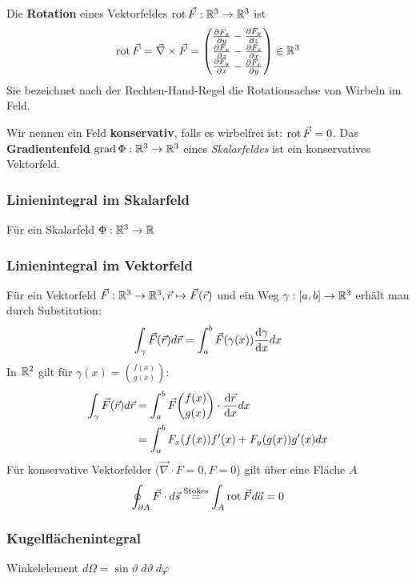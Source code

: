 Die \textbf{Rotation} eines Vektorfeldes $\operatorname{rot}\Vec{F}: \mathbb{R}^3 \to \mathbb{R}^3$ ist
$$\rot \Vec{F} = \Vec{\nabla} \times \Vec{F} =  \begin{pmatrix}\diffp{F_z}{y}-\diffp{F_y}{z}\\ \diffp{F_x}{z}-\diffp{F_z}{x} \\ \diffp{F_y}{x}-\diffp{F_x}{y}\end{pmatrix} \in \R^3$$
Sie bezeichnet nach der Rechten-Hand-Regel die Rotationsachse von Wirbeln im Feld.

Wir nennen ein Feld \textbf{konservativ}, falls es wirbelfrei ist: $\operatorname{rot}\Vec{F} = 0$. Das \textbf{Gradientenfeld} $\operatorname{grad} \Phi: \mathbb{R}^3 \to \mathbb{R}^3$ eines \textit{Skalarfeldes} ist ein konservatives Vektorfeld.

\subsubsection{Linienintegral im Skalarfeld}
Für ein Skalarfeld $\Phi: \mathbb{R}^3 \to \mathbb{R}$
\subsubsection{Linienintegral im Vektorfeld}
Für ein Vektorfeld $\Vec{F}:\mathbb{R}^3 \to \mathbb{R}^3, \Vec{r} \mapsto \Vec{F}(\Vec{r})$ und ein Weg $\gamma: [a,b] \to \mathbb{R}^3$ erhält man durch Substitution:
$$\int_\gamma \Vec{F}(\Vec{r}) d\Vec{r} = \int_a^b \Vec{F}(\gamma(x)) \diff{\gamma}{x} dx$$
In $\mathbb{R}^2$ gilt für $\gamma(x) = \binom{f(x)}{g(x)}$:
\begin{align*}
    \int_\gamma \Vec{F}(\Vec{r}) d\Vec{r} &= \int_a^b \Vec{F}\binom{f(x)}{g(x)}\cdot\diff{\Vec{r}}{x} dx\\
    &= \int_a^b F_x(f(x))f'(x) + F_y(g(x)) g'(x) dx 
\end{align*}
Für konservative Vektorfelder ($\Vec{\nabla} \cdot F = 0, F = 0$) gilt über eine Fläche $A$
$$\oint_{\partial A} \Vec{F} \cdot d\Vec{s} \stackrel{\text{Stokes}}{=} \int_{A} \operatorname{rot} \Vec{F} d\Vec{a} = 0$$
\subsubsection{Kugelflächenintegral}
Winkelelement $d\Omega = \sin \vartheta\ d\vartheta\ d\varphi$
